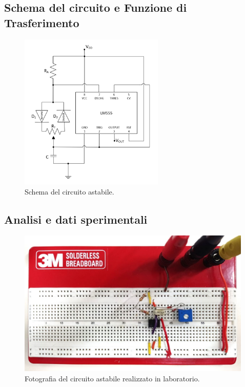 \documentclass{report}
\begin{document}
\subsection{Schema del circuito e Funzione di Trasferimento}
\begin{figure}[h!]
	\centering
	\includegraphics[height=7.5cm]{immagini/schema4}
	\caption{Schema del circuito astabile.}
	\label{figura:schema4}
\end{figure}
\subsection{Analisi e dati sperimentali}
\begin{figure}[h!]
	\centering
	\includegraphics[height=7cm]{immagini/circuito4}
	\caption{Fotografia del circuito astabile realizzato in laboratorio.}
	\label{figura:circuito4}
\end{figure}

\end{document}
